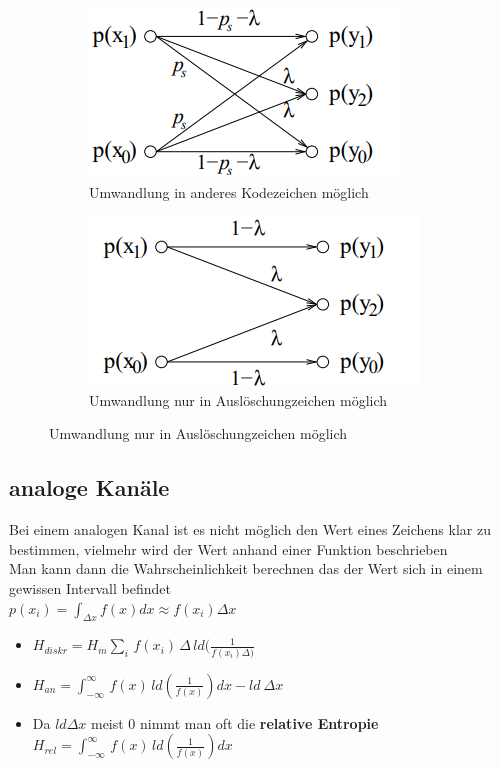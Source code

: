 \documentclass[12pt,a4paper]{article}
\begin{document}
\begin{figure}[H]
\begin{subfigure}{0.5\textwidth}
\includegraphics[scale=0.7]{./resources/bk_ausl.png}
\caption{Umwandlung in anderes Kodezeichen möglich}
\end{subfigure}
\begin{subfigure}{0.5\textwidth}
\includegraphics[scale=0.7]{resources/bk_ausl_2.png}
\caption{Umwandlung nur in Auslöschungzeichen möglich}
\end{subfigure}
\end{figure}


\subsection{analoge Kanäle}
Bei einem analogen Kanal ist es nicht möglich den Wert eines Zeichens klar zu bestimmen, vielmehr wird der Wert anhand einer Funktion beschrieben\\
Man kann dann die Wahrscheinlichkeit berechnen das der Wert sich in einem gewissen Intervall befindet\\
$p(x_i) = \int_{\Delta x} f(x) dx \approx f(x_i) \Delta x$
\begin{itemize}
\item $H_{diskr} = H_m \sum_i \, f(x_i) \, \Delta \, ld(\frac{1}{f(x_i)\Delta)}$
\item $H_{an} = \int_{-\infty}^{\infty} \, f(x) \, ld(\frac{1}{f(x)}) dx - ld \ \Delta x$
\item Da $ld \Delta x$ meist 0 nimmt man oft die \textbf{relative Entropie}\\
$H_{rel} = \int_{-\infty}^{\infty} \, f(x) \, ld(\frac{1}{f(x)}) dx$
\end{itemize}
\end{document}
